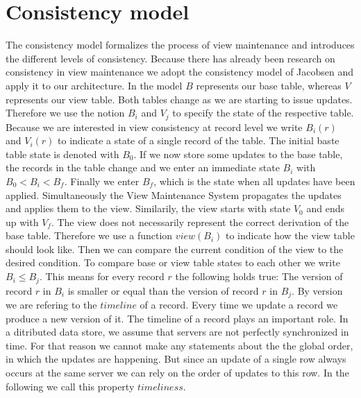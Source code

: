 \documentclass[11pt,a4paper,bibtotoc,idxtotoc,headsepline,footsepline,footexclude,BCOR12mm,DIV13]{scrbook}
\begin{document}
\section{Consistency model}
\label{sec:consistencymodel}

The consistency model formalizes the process of view maintenance and introduces the different levels of consistency. Because there has already been research on consistency in view maintenance\cite{zhuge:strobe, jacobsen:viewmaintenance} we adopt the consistency model of Jacobsen and apply it to our architecture.
In the model $B$ represents our base table, whereas $V$ represents our view table. Both tables change as we are starting to issue updates. Therefore we use the notion $B_i$ and $V_j$ to specify the state of the respective table. Because we are interested in view consistency at record level we write $B_i(r)$ and $V_i(r)$ to indicate a state of a single record of the table. The initial baste table state is denoted with $B_0$. If we now store some updates to the base table, the records in the table change and we enter an immediate state $B_i$ with $B_0 < B_i < B_f$. Finally we enter $B_f$, which is the state when all updates have been applied. Simultaneously the View Maintenance System propagates the updates and applies them to the view. Similarily, the view starts with state $V_0$ and ends up with $V_f$. The view does not necessarily represent the correct derivation of the base table. Therefore we use a function $view(B_i)$ to indicate how the view table should look like. Then we can compare the current condition of the view to the desired condition. To compare base or view table states to each other we write $B_i \leq B_j$. This means for every record $r$ the following holds true: The version of record $r$ in $B_i$ is smaller or equal than the version of record $r$ in $B_j$. By version we are refering to the $timeline$ of a record. Every time we update a record we produce a new version of it. The timeline of a record plays an important role. In a ditributed data store, we assume that servers are not perfectly synchronized in time. For that reason we cannot make any statements about the the global order, in which the updates are happening. But since an update of a single row always occurs at the same server we can rely on the order of updates to this row. In the following we call this property $timeliness$. 
\end{document}
